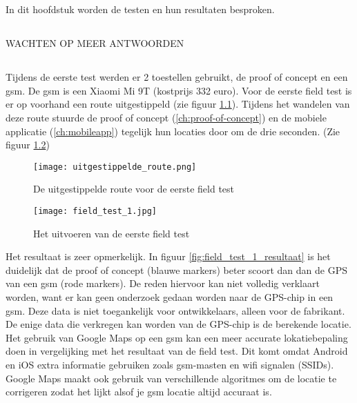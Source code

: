 \chapter{}
\label{ch:resultaten}
In dit hoofdstuk worden de testen en hun resultaten besproken.
\section{}
WACHTEN OP MEER ANTWOORDEN
\section{}
Tijdens de eerste test werden er 2 toestellen gebruikt, de proof of concept en een gsm. De gsm is een Xiaomi Mi 9T (kostprijs 332 euro).
Voor de eerste field test is er op voorhand een route uitgestippeld (zie figuur \ref{fig:uitgestippelde_route}). Tijdens het wandelen van deze route stuurde de proof of concept (\ref{ch:proof-of-concept}) en de mobiele applicatie (\ref{ch:mobileapp}) tegelijk hun locaties door om de drie seconden. (Zie figuur \ref{fig:field_test_1})
\begin{figure}
	\texttt{[image: uitgestippelde\_route.png]}
	\caption{De uitgestippelde route voor de eerste field test}
	\label{fig:uitgestippelde_route}
\end{figure}
\begin{figure}
	\texttt{[image: field\_test\_1.jpg]}
	\caption{Het uitvoeren van de eerste field test}
	\label{fig:field_test_1}
\end{figure}
\newline
\newline
Het resultaat is zeer opmerkelijk. In figuur \ref{fig:field_test_1_resultaat} is het duidelijk dat de proof of concept (blauwe markers) beter scoort dan dan de GPS van een gsm (rode markers). De reden hiervoor kan niet volledig verklaart worden, want er kan geen onderzoek gedaan worden naar de GPS-chip in een gsm. Deze data is niet toegankelijk voor ontwikkelaars, alleen voor de fabrikant. De enige data die verkregen kan worden van de GPS-chip is de berekende locatie. 
\newline
Het gebruik van Google Maps op een gsm kan een meer accurate lokatiebepaling doen in vergelijking met het resultaat van de field test. Dit komt omdat Android en iOS extra informatie gebruiken zoals gsm-masten en wifi signalen (SSIDs). Google Maps maakt ook gebruik van verschillende algoritmes om de locatie te corrigeren zodat het lijkt alsof je gsm locatie altijd accuraat is. 
